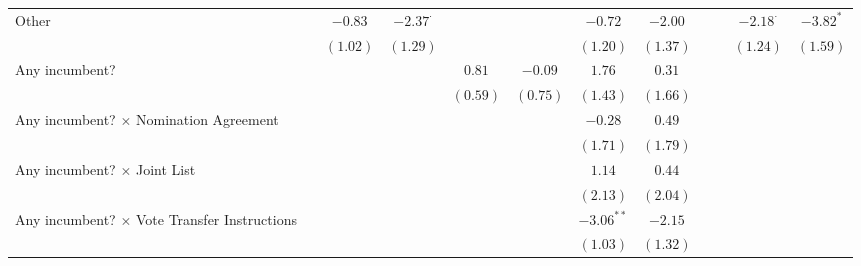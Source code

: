 \begin{sidewaystable}
\begin{center}
{\begin{tabular}{l c c c c c c c c c c c }
Other                                              &              & $-0.83$         & $-2.37^{\cdot}$ &                 &              & $-0.72$      & $-2.00$      &                 &              & $-2.18^{\cdot}$ & $-3.82^{*}$     \\
                                                   &              & $(1.02)$        & $(1.29)$        &                 &              & $(1.20)$     & $(1.37)$     &                 &              & $(1.24)$        & $(1.59)$        \\
Any incumbent?                                     &              &                 &                 & $0.81$          & $-0.09$      & $1.76$       & $0.31$       &                 &              &                 &                 \\
                                                   &              &                 &                 & $(0.59)$        & $(0.75)$     & $(1.43)$     & $(1.66)$     &                 &              &                 &                 \\
Any incumbent? $\times$ Nomination Agreement       &              &                 &                 &                 &              & $-0.28$      & $0.49$       &                 &              &                 &                 \\
                                                   &              &                 &                 &                 &              & $(1.71)$     & $(1.79)$     &                 &              &                 &                 \\
Any incumbent? $\times$ Joint List                 &              &                 &                 &                 &              & $1.14$       & $0.44$       &                 &              &                 &                 \\
                                                   &              &                 &                 &                 &              & $(2.13)$     & $(2.04)$     &                 &              &                 &                 \\
Any incumbent? $\times$ Vote Transfer Instructions &              &                 &                 &                 &              & $-3.06^{**}$ & $-2.15$      &                 &              &                 &                 \\
                                                   &              &                 &                 &                 &              & $(1.03)$     & $(1.32)$     &                 &              &                 &                 \\

\end{tabular}}
\end{center}
\end{sidewaystable}
